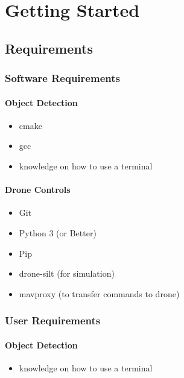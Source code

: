 \chapter{Getting Started}

\section{Requirements}
\subsection{Software Requirements}

\subsubsection{Object Detection \cite{darknet}}
\begin{itemize}
    \item cmake
    \item gcc
    \item knowledge on how to use a terminal
\end{itemize}

\subsubsection{Drone Controls}
\begin{itemize}
    \item Git
    \item Python 3 (or Better)
    \item Pip
    \item drone-silt (for simulation) \cite{dronekit}
    \item mavproxy (to transfer commands to drone) \cite{mavproxy}
\end{itemize}

\subsection{User Requirements}
\subsubsection{Object Detection}
\begin{itemize}
    \item knowledge on how to use a terminal
\end{itemize}